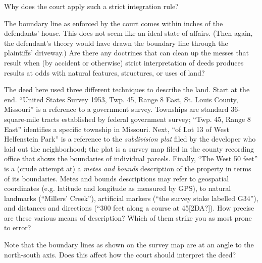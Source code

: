 
\item Why does the court apply such a strict integration rule?

\item The boundary line as enforced by the court comes within inches of the
defendants' house. This does not seem like an ideal state of affairs. (Then
again, the defendant's theory would have drawn the boundary line through the
plaintiffs' driveway.) Are there any doctrines that can clean up the messes
that result when (by accident or otherwise) strict interpretation of deeds
produces results at odds with natural features, structures, or uses of land?


\item The deed here used three different techniques to describe the land. Start
at the end. ``United States Survey 1953, Twp. 45, Range 8 East, St. Louis
County, Missouri'' is a reference to a government survey. Townships are
standard 36-square-mile tracts established by federal government survey; ``Twp.
45, Range 8 East'' identifies a specific township in Missouri. Next, ``of Lot
13 of West Helfenstein Park'' is a reference to the \textit{subdivision plat}
filed by the developer who laid out the neighborhood; the plat is a survey map
filed in the county recording office that shows the boundaries of individual
parcels. Finally, ``The West 50 feet'' is a (crude attempt at) a \textit{metes
and bounds} description of the property in terms of its boundaries. Metes and
bounds descriptions may refer to geospatial coordinates (e.g. latitude and
longitude as measured by GPS), to natural landmarks (``Millers' Creek''),
artificial markers (``the survey stake labelled G34''), and distances and
directions (``300 feet along a course at 45[2DA?]). How precise are these
various means of description? Which of them strike you as most prone to error?


\item Note that the boundary lines as shown on the survey map are at an angle to
the north-south axis. Does this affect how the court should interpret the deed?

